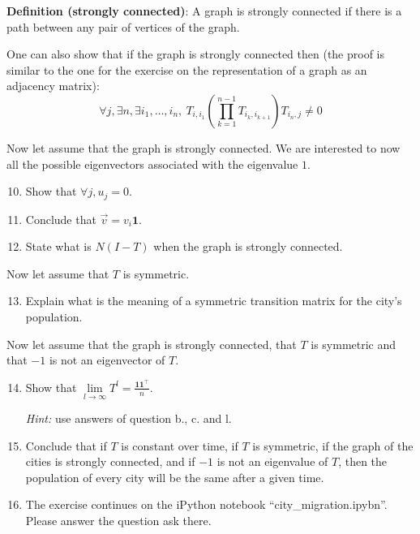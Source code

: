 \textbf{Definition (strongly connected)}: A graph is strongly connected if there is a path between any pair of vertices of the graph.

One can also show that if the graph is strongly connected then (the proof is similar to the one for the exercise on the representation of a graph as an adjacency matrix):
\[\forall j, \exists n, \exists i_1,\dots,i_n,\ T_{i,i_1} \left( \prod\limits_{k=1}^{n-1} T_{i_k, i_{k+1}} \right) T_{i_n, j} \neq 0\]


Now let assume that the graph is strongly connected. We are interested to now all the possible eigenvectors associated with the eigenvalue $1$.

\begin{enumerate}
\setcounter{enumi}{9}
\item Show that $\forall j, u_j = 0$.

\sol{}
\item Conclude that $\vec{v} = v_i \mathbf{1}$.

\sol{}
\item State what is $N(I-T)$ when the graph is strongly connected.

\sol{}
\end{enumerate}

Now let assume that $T$ is symmetric.
\begin{enumerate}
\setcounter{enumi}{12}
\item Explain what is the meaning of a symmetric transition matrix for the city's population.

\sol{}
\end{enumerate}


Now let assume that the graph is strongly connected, that $T$ is symmetric and that $-1$ is not an eigenvector of $T$.
\begin{enumerate}
\setcounter{enumi}{13}
\item Show that $\lim \limits_{l\rightarrow \infty} T^l = \frac{\mathbf{11}^\top}{n}$.

\textit{Hint:} use answers of question b., c. and l.

\sol{}
\item Conclude that if $T$ is constant over time, if $T$ is symmetric, if the graph of the cities is strongly connected, and if $-1$ is not an eigenvalue of $T$, then the population of every city will be the same after a given time.

\sol{}
\item The exercise continues on the iPython notebook ``city\_migration.ipybn''. Please answer the question ask there.
\end{enumerate}

